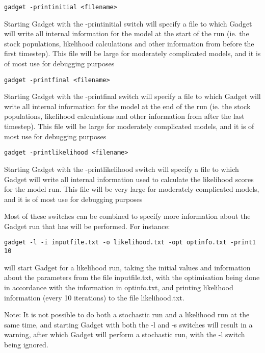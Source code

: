 \documentclass [a4paper, 10pt]{book}
\begin{document}
{\small\begin{verbatim}
gadget -printinitial <filename>
\end{verbatim}}
Starting Gadget with the -printinitial switch will specify a file to which Gadget will write all internal information for the model at the start of the run (ie. the stock populations, likelihood calculations and other information from before the first timestep).  This file will be large for moderately complicated models, and it is of most use for debugging purposes

{\small\begin{verbatim}
gadget -printfinal <filename>
\end{verbatim}}
Starting Gadget with the -printfinal switch will specify a file to which Gadget will write all internal information for the model at the end of the run (ie. the stock populations, likelihood calculations and other information from after the last timestep).  This file will be large for moderately complicated models, and it is of most use for debugging purposes

{\small\begin{verbatim}
gadget -printlikelihood <filename>
\end{verbatim}}
Starting Gadget with the -printlikelihood switch will specify a file to which Gadget will write all internal information used to calculate the likelihood scores for the model run.  This file will be very large for moderately complicated models, and it is of most use for debugging purposes

\newpage
Most of these switches can be combined to specify more information about the Gadget run that has will be performed.  For instance:

{\small\begin{verbatim}
gadget -l -i inputfile.txt -o likelihood.txt -opt optinfo.txt -print1 10
\end{verbatim}}

will start Gadget for a likelihood run, taking the initial values and information about the parameters from the file inputfile.txt, with the optimisation being done in accordance with the information in optinfo.txt, and printing likelihood information (every 10 iterations) to the file likelihood.txt.

\bigskip
Note: It is not possible to do both a stochastic run and a likelihood run at the same time, and starting Gadget with both the -l and -s switches will result in a warning, after which Gadget will perform a stochastic run, with the -l switch being ignored.
\end{document}
